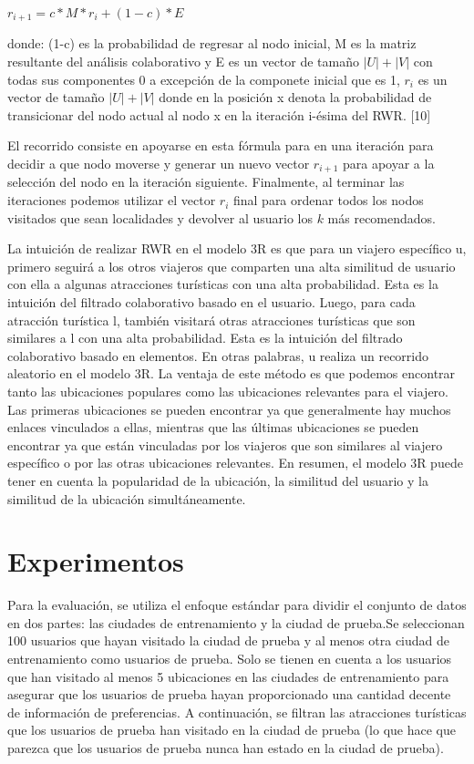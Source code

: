 \documentclass[runningheads]{llncs}
\begin{document}
$r_{i+1} = c*M*r_i + (1-c)*E$

donde: (1-c) es la probabilidad de regresar al nodo inicial, M es la matriz resultante del análisis colaborativo y E es un vector de tamaño $|U|+|V|$ con todas sus componentes 0 a excepción de la componete inicial que es 1, $r_i$ es un vector de tamaño $|U|+|V|$ donde en la posición x denota la probabilidad de transicionar del nodo actual al nodo x en la iteración i-ésima del RWR. [10]

El recorrido consiste en apoyarse en esta fórmula para en una iteración para decidir a que nodo moverse y generar un nuevo vector $r_{i+1}$ para apoyar a la selección del nodo en la iteración siguiente. Finalmente, al terminar las iteraciones podemos utilizar el vector $r_i$ final para ordenar todos los nodos visitados que sean localidades y devolver al usuario los $k$ más recomendados.

La intuición de realizar RWR en el modelo 3R es que para un viajero específico u, primero seguirá a los otros viajeros que comparten una alta similitud de usuario con ella a algunas atracciones turísticas con una alta probabilidad. Esta es la intuición del filtrado colaborativo basado en el usuario. Luego, para cada atracción turística l, también visitará otras atracciones turísticas que son similares a l con una alta probabilidad. Esta es la intuición del filtrado colaborativo basado en elementos. En otras palabras, u realiza un recorrido aleatorio en el modelo 3R. La ventaja de este método es que podemos encontrar tanto las ubicaciones populares como las ubicaciones relevantes para el viajero. Las primeras ubicaciones se pueden encontrar ya que generalmente hay muchos enlaces vinculados a ellas, mientras que las últimas ubicaciones se pueden encontrar ya que están vinculadas por los viajeros que son similares al viajero específico o por las otras ubicaciones relevantes. En resumen, el modelo 3R puede tener en cuenta la popularidad de la ubicación, la similitud del usuario y la similitud de la ubicación simultáneamente.


\section{Experimentos}
Para la evaluación, se utiliza el enfoque estándar para dividir el conjunto de datos en dos partes: las ciudades de entrenamiento y la ciudad de prueba.Se seleccionan 100 usuarios que hayan visitado la ciudad de prueba y al menos otra ciudad de entrenamiento como usuarios de prueba. Solo se tienen en cuenta a los usuarios que han visitado al menos 5 ubicaciones en las ciudades de entrenamiento para asegurar que los usuarios de prueba hayan proporcionado una cantidad decente de información de preferencias. A continuación, se filtran las atracciones turísticas que los usuarios de prueba han visitado en la ciudad de prueba (lo que hace que parezca que los usuarios de prueba nunca han estado en la ciudad de prueba).
\end{document}
